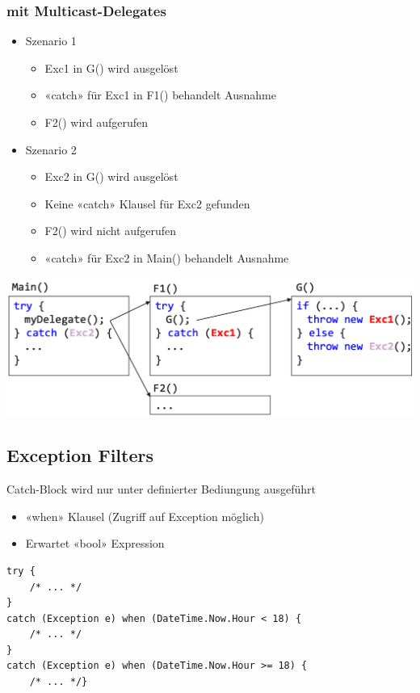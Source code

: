 \subsubsection{mit Multicast-Delegates}
\begin{itemize}
    \item Szenario 1
    \begin{itemize}
        \item Exc1 in G() wird ausgelöst
        \item «catch» für Exc1 in F1() behandelt Ausnahme
        \item F2() wird aufgerufen
    \end{itemize}
    \item Szenario 2
    \begin{itemize}
        \item Exc2 in G() wird ausgelöst
        \item Keine «catch» Klausel für Exc2 gefunden
        \item F2() wird nicht aufgerufen
        \item «catch» für Exc2 in Main() behandelt Ausnahme
    \end{itemize}
\end{itemize}
\vspace{-8pt}
\begin{center}
    \includegraphics[scale=.27]{graphic/exceptions/suche delegate multicast.png}
\end{center}
\vspace{-8pt}

\subsection{Exception Filters}
Catch-Block wird nur unter definierter Bediungung ausgeführt

\begin{itemize}
    \item «when» Klausel (Zugriff auf Exception möglich)
    \item Erwartet «bool» Expression
\end{itemize}
\begin{lstlisting}
try {
    /* ... */
}
catch (Exception e) when (DateTime.Now.Hour < 18) {
    /* ... */
}
catch (Exception e) when (DateTime.Now.Hour >= 18) {
    /* ... */}
\end{lstlisting}

